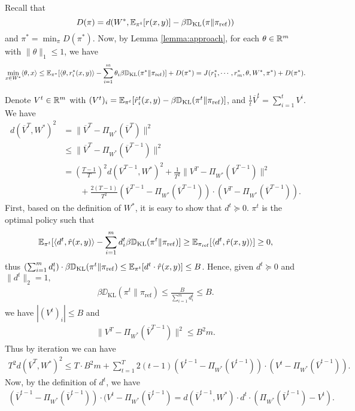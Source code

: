 Recall that $$D(\pi) = d(W^*, \mathbb{E}_{\pi^t}[r(x,y)]-\beta \mathbb{D}_{\mathrm{KL}}(\pi\|\pi_{\mathrm{ref}}))$$ and $\pi^* = \min_\pi D(\pi^*)$. Now, by Lemma \ref{lemma:approach}, for each $\theta \in \mathbb{R}^m$ with $\|\theta\|_1 \le 1$, we have 
$$\min_{x \in W^*}\langle \theta, x\rangle\le  \mathbb{E}_{\pi^*}[\langle \theta, r_i^*(x,y)\rangle-\sum_{i=1}^m \theta_i\beta \mathbb{D}_{\mathrm{KL}}(\pi^*\|\pi_{\mathrm{ref}})] + D(\pi^*) = J(r_1^*, \cdots, r_m^*, \theta, W^*, \pi^*) +  D(\pi^*).$$

Denote $V^t \in \mathbb{R}^m$ with $(V^t)_i = \mathbb{E}_{\pi^t}[\hat{r}_i^t(x,y) - \beta\mathbb{D}_{\mathrm{KL}}(\pi^t \| \pi_{\mathrm{ref}})]$, and $\frac{1}{t}\overline{V}^t = \sum_{i=1}^t V^i$. We have 
\begin{align*}
    d(\overline{V}^T, W^*)^2 &= \|\overline{V}^T - \Pi_{W^*} (\overline{V}^T)\|^2 \\
    &\le \|\overline{V}^T - \Pi_{W^*} (\overline{V}^{T-1})\|^2\\
    & = \left(\frac{T-1}{T}\right)^2 d(\overline{V}^{T-1}, W^*)^2 + \frac{1}{T^2} \|V^T - \Pi_{W^*}(\overline{V}^{T-1})\|^2 \\
    &\qquad + \frac{2(T-1)}{T^2}(\overline{V}^{T-1} - \Pi_{W^*} (\overline{V}^{T-1}))\cdot (V^T - \Pi_{W^*}(\overline{V}^{T-1})).\end{align*}
First, based on the definition of $W^*$, it is easy to show that $d^t \succeq 0.$
$\pi^t$ is the optimal policy such that $$\mathbb{E}_{\pi^t}[\langle d^t, \hat{r}(x,y) \rangle - \sum_{i=1}^m d^t_i\beta \mathbb{D}_{\mathrm{KL}}(\pi^t \|\pi_{\mathrm{ref}})] \ge  \mathbb{E}_{\pi_{\mathrm{ref}}}[\langle d^t , \hat{r}(x,y) \rangle]\ge 0,$$
thus $(\sum_{i=1}^m d_i^t)\cdot \beta \mathbb{D}_{\mathrm{KL}}(\pi^t \| \pi_{\mathrm{ref}}) \le \mathbb{E}_{\pi^t}[d^t\cdot  \hat{r}(x,y)] \le B$. Hence, given $d^t \succeq 0$ and $\|d^t\|_2 =1,$
\begin{align*}
    \beta \DD_{\mathrm{KL}}(\pi^t \| \pi_{\mathrm{ref}}) \le \frac{B}{\sum_{i=1}^m d_i^t}\le B.
\end{align*}
we have $|(V^t)_i| \le B$ and 
\begin{align*}
    \|V^T - \Pi_{W^*}(\overline{V}^{T-1})\|^2 \le B^2m.
\end{align*}
Thus by iteration we can have 
\begin{align*}
    T^2 d(\overline{V}^T, W^*)^2 \le T\cdot B^2m + \sum_{t=1}^T 2(t-1) (\overline{V}^{t-1}-\Pi_{W^*}(\overline{V}^{t-1}))\cdot (V^t - \Pi_{W^*}(\overline{V}^{t-1})).
\end{align*}
Now, by the definition of $d^t$, we have
\begin{align*}
    (\overline{V}^{t-1}-\Pi_{W^*}(\overline{V}^{t-1}))\cdot (V^t - \Pi_{W^*}(\overline{V}^{t-1})=
    d(\overline{V}^{t-1}, W^*)\cdot d^t\cdot (\Pi_{W^*}(\overline{V}^{t-1}) - V^t).
    \end{align*}
